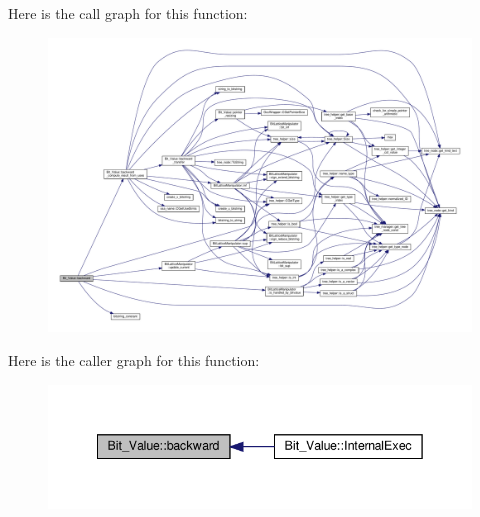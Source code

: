 Here is the call graph for this function\+:
\nopagebreak
\begin{figure}[H]
\begin{center}
\leavevmode
\includegraphics[width=350pt]{df/d4b/classBit__Value_a45f7af464b055789135126c85c65deea_cgraph}
\end{center}
\end{figure}
Here is the caller graph for this function\+:
\nopagebreak
\begin{figure}[H]
\begin{center}
\leavevmode
\includegraphics[width=342pt]{df/d4b/classBit__Value_a45f7af464b055789135126c85c65deea_icgraph}
\end{center}
\end{figure}
\mbox{\label{classBit__Value_ad2b5f1be449648c702b1cfe905c6f7ab}} 
